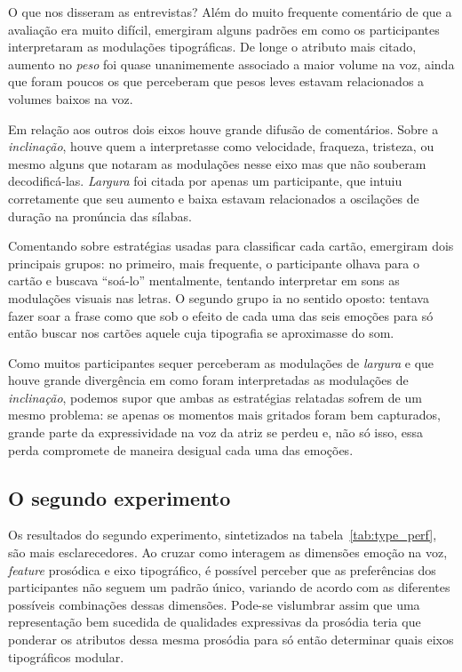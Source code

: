 \documentclass[a4paper]{tufte-handout}
\begin{document}
O que nos disseram as entrevistas? Além do muito frequente comentário de que a avaliação era muito difícil, emergiram alguns padrões em como os participantes interpretaram as modulações tipográficas. De longe o atributo mais citado, aumento no \textit{peso} foi quase unanimemente associado a maior volume na voz, ainda que foram poucos os que perceberam que pesos leves estavam relacionados a volumes baixos na voz.

Em relação aos outros dois eixos houve grande difusão de comentários. Sobre a \textit{inclinação}, houve quem a interpretasse como velocidade, fraqueza, tristeza, ou mesmo alguns que notaram as modulações nesse eixo mas que não souberam decodificá-las. \textit{Largura} foi citada por apenas um participante, que intuiu corretamente que seu aumento e baixa estavam relacionados a oscilações de duração na pronúncia das sílabas.

Comentando sobre estratégias usadas para classificar cada cartão, emergiram dois principais grupos: no primeiro, mais frequente, o participante olhava para o cartão e buscava ``soá-lo'' mentalmente, tentando interpretar em sons as modulações visuais nas letras. O segundo grupo ia no sentido oposto: tentava fazer soar a frase como que sob o efeito de cada uma das seis emoções para só então buscar nos cartões aquele cuja tipografia se aproximasse do som.

Como muitos participantes sequer perceberam as modulações de \textit{largura} e que houve grande divergência em como foram interpretadas as modulações de \textit{inclinação}, podemos supor que ambas as estratégias relatadas sofrem de um mesmo problema: se apenas os momentos mais gritados foram bem capturados, grande parte da expressividade na voz da atriz se perdeu e, não só isso, essa perda compromete de maneira desigual cada uma das emoções.

\subsection{O segundo experimento}

Os resultados do segundo experimento, sintetizados na tabela~\ref{tab:type_perf}, são mais esclarecedores. Ao cruzar como interagem as dimensões emoção na voz, \textit{feature} prosódica e eixo tipográfico, é possível perceber que as preferências dos participantes não seguem um padrão único, variando de acordo com as diferentes possíveis combinações dessas dimensões. Pode-se vislumbrar assim que uma representação bem sucedida de qualidades expressivas da prosódia teria que ponderar os atributos dessa mesma prosódia para só então determinar quais eixos tipográficos modular.
\end{document}
